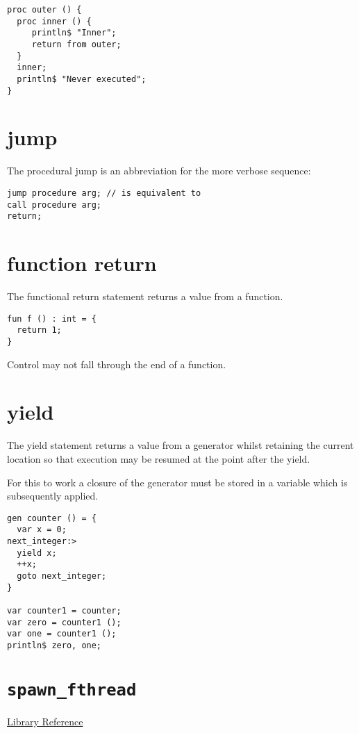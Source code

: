 \documentclass[oneside]{book}
\begin{document}
{\begin{verbatim}
proc outer () {
  proc inner () {
     println$ "Inner";
     return from outer;
  }
  inner;
  println$ "Never executed";
}
\end{verbatim}


\section{jump }
The procedural jump is an abbreviation for 
the more verbose sequence:

\begin{verbatim}
jump procedure arg; // is equivalent to
call procedure arg;
return;
\end{verbatim}


\section{function return}
The functional return statement returns a value from
a function.

\begin{verbatim}
fun f () : int = {
  return 1;
}
\end{verbatim}

Control may not fall through the end of a function.

\section{yield}
The yield statement returns a value from a generator
whilst retaining the current location so that execution
may be resumed at the point after the yield.

For this to work a closure of the generator must be stored
in a variable which is subsequently applied.

\begin{verbatim}
gen counter () = { 
  var x = 0;
next_integer:>
  yield x;
  ++x;
  goto next_integer;
}

var counter1 = counter;
var zero = counter1 ();
var one = counter1 ();
println$ zero, one;
\end{verbatim}



\section{{\tt spawn\_fthread}}
\href{http://felix-lang.org/share/lib/std/control/fibres.flx}{Library Reference}

}
\end{document}
